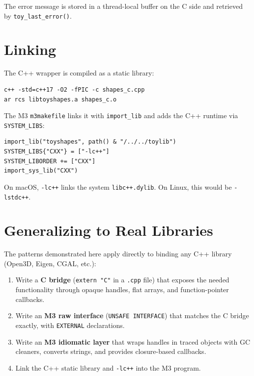 \documentclass[11pt]{article}
\begin{document}
The error message is stored in a thread-local buffer on the C side
and retrieved by \texttt{toy\_last\_error()}.

\section{Linking}

The C++ wrapper is compiled as a static library:

\begin{lstlisting}
c++ -std=c++17 -O2 -fPIC -c shapes_c.cpp
ar rcs libtoyshapes.a shapes_c.o
\end{lstlisting}

The M3 \texttt{m3makefile} links it with \texttt{import\_lib} and
adds the C++ runtime via \texttt{SYSTEM\_LIBS}:

\begin{lstlisting}
import_lib("toyshapes", path() & "/../../toylib")
SYSTEM_LIBS{"CXX"} = ["-lc++"]
SYSTEM_LIBORDER += ["CXX"]
import_sys_lib("CXX")
\end{lstlisting}

On macOS, \texttt{-lc++} links the system \texttt{libc++.dylib}.
On Linux, this would be \texttt{-lstdc++}.

\section{Generalizing to Real Libraries}

The patterns demonstrated here apply directly to binding any
C++ library (Open3D, Eigen, CGAL, etc.):

\begin{enumerate}
\item Write a \textbf{C bridge} (\texttt{extern "C"} in a
  \texttt{.cpp} file) that exposes the needed functionality
  through opaque handles, flat arrays, and function-pointer
  callbacks.

\item Write an \textbf{M3 raw interface} (\texttt{UNSAFE INTERFACE})
  that matches the C bridge exactly, with \texttt{EXTERNAL}
  declarations.

\item Write an \textbf{M3 idiomatic layer} that wraps handles in
  traced objects with GC cleaners, converts strings, and provides
  closure-based callbacks.

\item Link the C++ static library and \texttt{-lc++} into the
  M3 program.
\end{enumerate}
\end{document}
